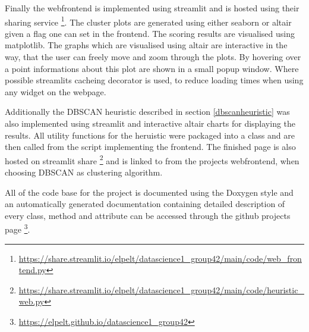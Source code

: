 Finally the webfrontend is implemented using streamlit and is hosted using their sharing service \footnote{\scriptsize\url{https://share.streamlit.io/elpelt/datascience1_group42/main/code/web_frontend.py}}. The cluster plots are generated using either seaborn or altair given a flag one can set in the frontend. The scoring results are visualised using matplotlib. The graphs which are visualised using altair are interactive in the way, that the user can freely move and zoom through the plots. By hovering over a point informations about this plot are shown in a small popup window. Where possible streamlits cacheing decorator is used, to reduce loading times when using any widget on the webpage.

Additionally the DBSCAN heuristic described in section \ref{dbscanheuristic} was also implemented using streamlit and interactive altair charts for displaying the results. All utility functions for the heruistic were packaged into a class and are then called from the script implementing the frontend. The finished page is also hosted on streamlit share \footnote{\url{https://share.streamlit.io/elpelt/datascience1_group42/main/code/heuristic_web.py}} and is linked to from the projects webfrontend, when choosing DBSCAN as clustering algorithm.

All of the code base for the project is documented using the Doxygen style and an automatically generated documentation containing detailed description of every class, method and attribute can be accessed through the github projects page \footnote{\url{https://elpelt.github.io/datascience1_group42}}.